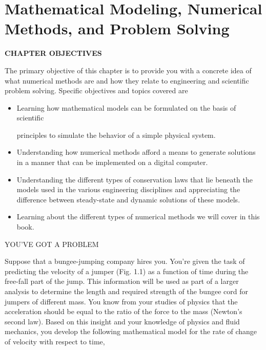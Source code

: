 \documentclass[../main.tex]{subfiles}
\begin{document}
\chapter{Mathematical Modeling, Numerical Methods, and Problem Solving}




\begin{center}
\Large{\textbf{CHAPTER OBJECTIVES}}
\end{center}

\normalsize{The primary objective of this chapter is to provide you with a concrete idea of what
numerical methods are and how they relate to engineering and scientific problem
solving. Specific objectives and topics covered are}

\begin{itemize}

\item Learning how mathematical models can be formulated on the basis of scientific

principles to simulate the behavior of a simple physical system.
\item Understanding how numerical methods afford a means to generate solutions in a
manner that can be implemented on a digital computer.

\item Understanding the different types of conservation laws that lie beneath the models
used in the various engineering disciplines and appreciating the difference
between steady-state and dynamic solutions of these models.

\item Learning about the different types of numerical methods we will cover in this
book.

\end{itemize}
\Large{YOU'VE GOT A PROBLEM}


\normalsize{Suppose that a bungee-jumping company hires you. You're given the task of predicting the velocity of a jumper (Fig. 1.1)  as a function of time during the free-fall part
of the jump. This information will be used as part of a larger analysis to determine the
length and required strength of the bungee cord for jumpers of different mass.
You know from your studies of physics that the acceleration should be equal to the ratio
of the force to the mass (Newton's second law). Based on this insight and your knowledge of physics and fluid mechanics, you develop the following mathematical model for the rate
of change of velocity with respect to time, }
\newpage
\end{document}
